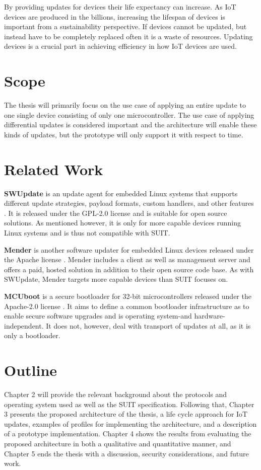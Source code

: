 \documentclass[0-thesis.tex]{subfiles}
\begin{document}
By providing updates for devices their life expectancy can increase. As IoT devices are
produced in the billions, increasing the lifespan of devices is important from a
sustainability perspective. If devices cannot be updated, but instead have to be completely
replaced often it is a waste of resources. Updating devices is a crucial part in achieving
efficiency in how IoT devices are used.

\section{Scope}
\label{sec:scope}
The thesis will primarily focus on the use case of applying an entire update to one single
device consisting of only one microcontroller. The use case of applying differential
updates is considered important and the architecture will enable these kinds of updates,
but the prototype will only support it with respect to time.

\section{Related Work}
\label{sec:related-work}
\textbf{SWUpdate} is an update agent for embedded Linux systems that supports different
update strategies, payload formats, custom handlers, and other features
\parencite{swupdate}. It is released under the GPL-2.0 license and is suitable for open
source solutions. As mentioned however, it is only for more capable devices running Linux
systems and is thus not compatible with SUIT.

\textbf{Mender} is another software updater for embedded Linux devices released under the
Apache license \parencite{mender}. Mender includes a client as well as management server
and offers a paid, hosted solution in addition to their open source code base. As with
SWUpdate, Mender targets more capable devices than SUIT focuses on.

\textbf{MCUboot} is a secure bootloader for 32-bit microcontrollers released under the
Apache-2.0 license \parencite{MCUboot}. It aims to define a common bootloader
infrastructure as to enable secure software upgrades and is operating system-and
hardware-independent. It does not, however, deal with transport of updates at all, as it
is only a bootloader.

\section{Outline}
\label{sec:outline}
Chapter 2 will provide the relevant background about the protocols and operating system
used as well as the SUIT specification. Following that, Chapter 3 presents the proposed
architecture of the thesis, a life cycle approach for IoT updates, examples of profiles
for implementing the architecture, and a description of a prototype implementation.
Chapter 4 shows the results from evaluating the proposed architecture in both a
qualitative and quantitative manner, and Chapter 5 ends the thesis with a discussion,
security considerations, and future work.
\end{document}
